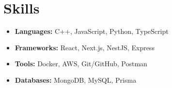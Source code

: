 \documentclass[a4paper,10pt]{article}
\begin{document}
\section*{Skills}
\begin{multicols}{2}
\begin{itemize}[leftmargin=0.5cm]
    \item \textbf{Languages:} C++, JavaScript, Python, TypeScript
    \item \textbf{Frameworks:} React, Next.js, NestJS, Express
    \item \textbf{Tools:} Docker, AWS, Git/GitHub, Postman
    \item \textbf{Databases:} MongoDB, MySQL, Prisma
\end{itemize}
\end{multicols}
\end{document}
